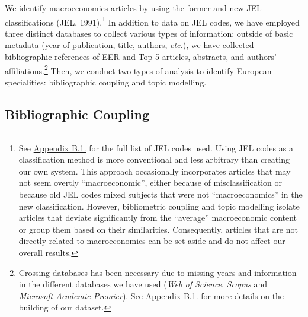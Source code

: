 \documentclass[
  12pt,
  onecolumn]{article}
\begin{document}
We identify macroeconomics articles by using the former and new JEL classifications (\protect\hyperlink{ref-jel1991}{JEL, 1991}).\footnote{See \protect\hyperlink{eer-top5-macro}{Appendix B.1.} for the full list of JEL codes used. Using JEL codes as a classification method is more conventional and less arbitrary than creating our own system. This approach occasionally incorporates articles that may not seem overtly ``macroeconomic'', either because of misclassification or because old JEL codes mixed subjects that were not ``macroeconomics'' in the new classification. However, bibliometric coupling and topic modelling isolate articles that deviate significantly from the ``average'' macroeconomic content or group them based on their similarities. Consequently, articles that are not directly related to macroeconomics can be set aside and do not affect our overall results.} In addition to data on JEL codes, we have employed three distinct databases to collect various types of information: outside of basic metadata (year of publication, title, authors, \emph{etc.}), we have collected bibliographic references of EER and Top 5 articles, abstracts, and authors' affiliations.\footnote{Crossing databases has been necessary due to missing years and information in the different databases we have used (\emph{Web of Science}, \emph{Scopus} and \emph{Microsoft Academic Premier}). See \protect\hyperlink{corpus}{Appendix B.1.} for more details on the building of our dataset.} Then, we conduct two types of analysis to identify European specialities: bibliographic coupling and topic modelling.

\hypertarget{bibliographic-coupling}{%
\subsection{Bibliographic Coupling}\label{bibliographic-coupling}}
\end{document}
